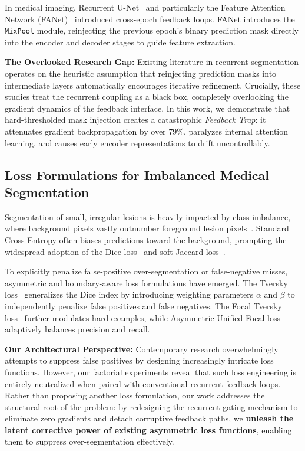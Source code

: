 In medical imaging, Recurrent U-Net~\cite{alom2018recurrent} and
particularly the Feature Attention Network (FANet)~\cite{tomar2021fanet}
introduced cross-epoch feedback loops. FANet introduces the \texttt{MixPool}
module, reinjecting the previous epoch's binary prediction mask directly
into the encoder and decoder stages to guide feature extraction.

\textbf{The Overlooked Research Gap:}
Existing literature in recurrent segmentation operates on the heuristic
assumption that reinjecting prediction masks into intermediate layers
automatically encourages iterative refinement. Crucially, these studies
treat the recurrent coupling as a black box, completely overlooking the
gradient dynamics of the feedback interface. In this work, we demonstrate
that hard-thresholded mask injection creates a catastrophic
\textit{Feedback Trap}: it attenuates gradient backpropagation by over
$79\%$, paralyzes internal attention learning, and causes early encoder
representations to drift uncontrollably.

\subsection{Loss Formulations for Imbalanced Medical Segmentation}
Segmentation of small, irregular lesions is heavily impacted by class
imbalance, where background pixels vastly outnumber foreground lesion
pixels~\cite{salehi2017tversky}. Standard Cross-Entropy often biases
predictions toward the background, prompting the widespread adoption of
the Dice loss~\cite{milletari2016vnet} and soft Jaccard
loss~\cite{rahman2016optimizing}.

To explicitly penalize false-positive over-segmentation or false-negative
misses, asymmetric and boundary-aware loss formulations have emerged. The
Tversky loss~\cite{salehi2017tversky} generalizes the Dice index by
introducing weighting parameters $\alpha$ and $\beta$ to independently
penalize false positives and false negatives. The Focal Tversky
loss~\cite{abraham2019novel} further modulates hard examples, while
Asymmetric Unified Focal loss~\cite{yeung2022unified} adaptively balances
precision and recall.

\textbf{Our Architectural Perspective:}
Contemporary research overwhelmingly attempts to suppress false positives
by designing increasingly intricate loss functions. However, our factorial
experiments reveal that such loss engineering is entirely neutralized when
paired with conventional recurrent feedback loops. Rather than proposing
another loss formulation, our work addresses the structural root of the
problem: by redesigning the recurrent gating mechanism to eliminate zero
gradients and detach corruptive feedback paths, we \textbf{unleash the
latent corrective power of existing asymmetric loss functions}, enabling
them to suppress over-segmentation effectively.
